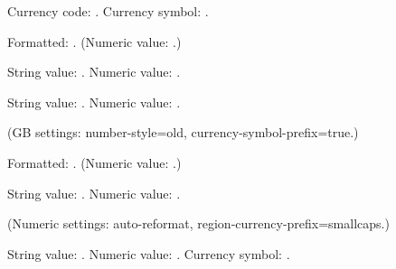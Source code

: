 \documentclass[12pt]{article}
\begin{document}
Currency code: \DTLCurrencyCode.
Currency symbol: \DTLCurrencySymbol. 

Formatted: \formattedresult.
(Numeric value: \DTLdatumvalue{\formattedresult}.) 

\DTLparse{}
String value: \parsed.
Numeric value: \DTLdatumvalue{\parsed}. 

\DTLparse{}
String value: \parsed.
Numeric value: \DTLdatumvalue{\parsed}. 

(GB settings: number-style=old, currency-symbol-prefix=true.) 

Formatted: \formattedresult.
(Numeric value: \DTLdatumvalue{\formattedresult}.) 

\DTLparse{}
String value: \parsed.
Numeric value: \DTLdatumvalue{\parsed}. 

(Numeric settings: auto-reformat, region-currency-prefix=smallcaps.) 

\DTLparse{}
String value: \parsed.
Numeric value: \DTLdatumvalue{\parsed}.
Currency symbol: \DTLdatumcurrency{\parsed}. 
\end{document}
